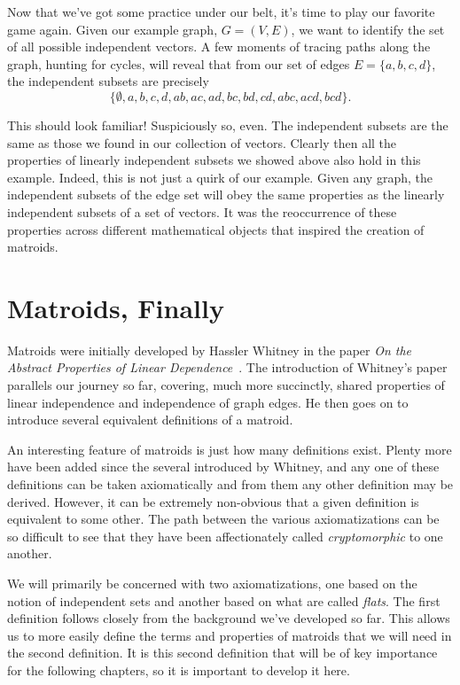 \documentclass[12pt,oneside]{../../sfsuthesis}
\begin{document}
Now that we've got some practice under our belt, it's time to play our favorite game again.
Given our example graph, \( G = (V, E) \), we want to identify the set of all possible independent vectors.
A few moments of tracing paths along the graph, hunting for cycles, will reveal that from our set of edges \( E = \{ a, b, c, d \} \), the independent subsets are precisely
\[
    \{
    \emptyset,
    a, b, c, d,
    ab, ac, ad, bc, bd, cd,
    abc, acd, bcd
    \}.
\]

This should look familiar!
Suspiciously so, even.
The independent subsets are the same as those we found in our collection of vectors.
Clearly then all the properties of linearly independent subsets we showed above also hold in this example.
Indeed, this is not just a quirk of our example.
Given any graph, the independent subsets of the edge set will obey the same properties as the linearly independent subsets of a set of vectors.
It was the reoccurrence of these properties across different mathematical objects that inspired the creation of matroids.

\section{Matroids, Finally}

Matroids were initially developed by Hassler Whitney in the paper \textit{On the Abstract Properties of Linear Dependence}~\cite{whitneyAbstractPropertiesLinear1935}.
The introduction of Whitney's paper parallels our journey so far, covering, much more succinctly, shared properties of linear independence and independence of graph edges.
He then goes on  to introduce several equivalent definitions of a matroid.

An interesting feature of matroids is just how many definitions exist.
Plenty more have been added since the several introduced by Whitney, and
any one of these definitions can be taken axiomatically and from them any other definition may be derived.
However, it can be extremely non-obvious that a given definition is equivalent to some other.
The path between the various axiomatizations can be so difficult to see that they have been affectionately called \textit{cryptomorphic} to one another.

We will primarily be concerned with two axiomatizations, one based on the notion of independent sets and another based on what are called \emph{flats}.
The first definition follows closely from the background we've developed so far.
This allows us to more easily define the terms and properties of matroids that we will need in the second definition.
It is this second definition that will be of key importance for the following chapters, so it is important to develop it here.
\end{document}
